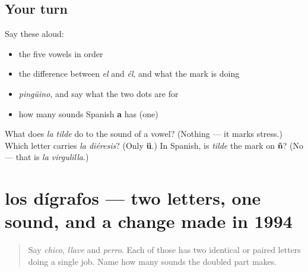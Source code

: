 \subsection*{Your turn}
Say these aloud:

\begin{itemize}
\raggedright
  \item the five vowels in order
  \item the difference between \emph{el} and \emph{él}, and what the mark is doing
  \item \emph{pingüino}, and say what the two dots are for
  \item how many sounds Spanish \textbf{a} has (one)
\end{itemize}

\begin{tcolorbox}[breakable,colback=teal!4,colframe=teal!35!black,title={Before you move on}]
What does \emph{la tilde} do to the sound of a vowel? (Nothing — it marks stress.) Which letter carries \emph{la diéresis}? (Only \textbf{ü}.) In Spanish, is \emph{tilde} the mark on \textbf{ñ}? (No — that is \emph{la virgulilla}.)
\end{tcolorbox}
\section[los dígrafos]{los dígrafos — two letters, one sound, and a change made in 1994}

\label{lesson:ES-C425-digrafos}



\begin{quote}
Say \emph{chico}, \emph{llave} and \emph{perro}. Each of those has two identical or paired letters doing a single job. Name how many sounds the doubled part makes.
\end{quote}

